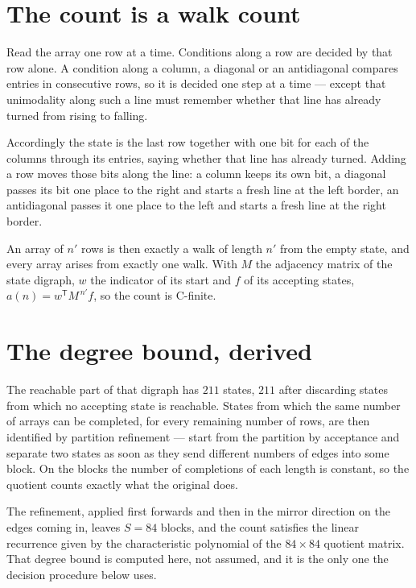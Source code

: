 \documentclass[11pt]{article}
\theoremstyle{definition}
\begin{document}
\section{The count is a walk count}

Read the array one row at a time. Conditions along a row are decided by that row alone. A condition along a column, a diagonal or an antidiagonal compares entries in consecutive rows, so it is decided one step at a time --- except that unimodality along such a line must remember whether that line has already turned from rising to falling.

Accordingly the state is the last row together with one bit for each of the columns through its entries, saying whether that line has already turned. Adding a row moves those bits along the line: a column keeps its own bit, a diagonal passes its bit one place to the right and starts a fresh line at the left border, an antidiagonal passes it one place to the left and starts a fresh line at the right border.

An array of $n'$ rows is then exactly a walk of length $n'$ from the empty state, and every array arises from exactly one walk. With $M$ the adjacency matrix of the state digraph, $w$ the indicator of its start and $f$ of its accepting states, $a(n) = w^{\mathsf T}M^{\,n'}f$, so the count is C-finite.

\section{The degree bound, derived}

The reachable part of that digraph has $211$ states, $211$ after discarding states from which no accepting state is reachable. States from which the same number of arrays can be completed, for every remaining number of rows, are then identified by partition refinement --- start from the partition by acceptance and separate two states as soon as they send different numbers of edges into some block. On the blocks the number of completions of each length is constant, so the quotient counts exactly what the original does.

The refinement, applied first forwards and then in the mirror direction on the edges coming in, leaves $S = 84$ blocks, and the count satisfies the linear recurrence given by the characteristic polynomial of the $84 \times 84$ quotient matrix. That degree bound is computed here, not assumed, and it is the only one the decision procedure below uses.
\end{document}
